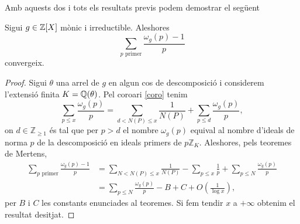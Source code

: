 Amb aquests dos i tots els resultats previs podem demostrar el següent
\begin{lem}[tècnic]
    Sigui $g\in\mathbb{Z}[X]$ mònic i irreductible. Aleshores
    \[
    \sum_{p\text{ primer}}\frac{\omega_g(p)-1}{p}
    \]
    convergeix.
\end{lem}
\begin{proof}
    Sigui $\theta$ una arrel de $g$ en algun cos de descomposició i considerem l'extensió finita $K=\mathbb{Q}(\theta)$. Pel coro\lgem ari \ref{coro} tenim
    \[
    \sum_{p\leq x}\frac{\omega_g(p)}{p}=\sum_{d<N(P)\leq x}\frac{1}{N(P)}+\sum_{p\leq d}\frac{\omega_g(p)}{p},
    \]
    on $d\in\mathbb Z_{\geq 1}$ és tal que per $p>d$ el nombre $\omega_g(p)$ equival al nombre d'ideals de norma $p$ de la descomposició en ideals primers de $p\mathbb Z_K$. Aleshores, pels teoremes de Mertens,
    \begin{align*}
        \sum_{p\text{ primer}}\frac{\omega_g(p)-1}{p}&=\sum_{N<N(P)\leq x}\frac{1}{N(P)}-\sum_{p\leq x}\frac{1}{p}+\sum_{p\leq N}\frac{\omega_g(p)}{p}\\
        &=\sum_{p\leq N}\frac{\omega_g(p)}{p}-B+C+O\left(\frac{1}{\log x}\right),
    \end{align*}
    per $B$ i $C$ les constants enunciades al teoremes. Si fem tendir $x$ a $+\infty$ obtenim el resultat desitjat.
\end{proof}

    
